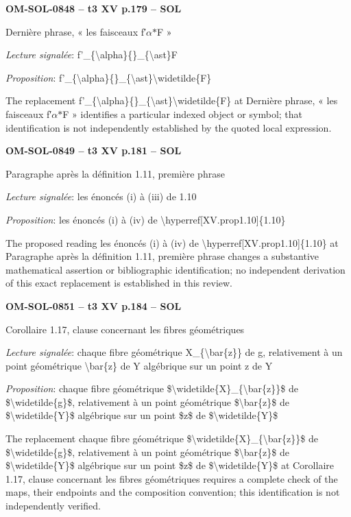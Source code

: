 \par\noindent\textbf{OM-SOL-0848 -- t3 XV p.179 -- SOL}\par
Dernière phrase, « les faisceaux f′\ensuremath{\alpha}\ensuremath{\ast}F »\par
\emph{Lecture signalée}: f'\_\{\textbackslash{}alpha\}\{\}\_\{\textbackslash{}ast\}F\par
\emph{Proposition}: f'\_\{\textbackslash{}alpha\}\{\}\_\{\textbackslash{}ast\}\textbackslash{}widetilde\{F\}\par
The replacement f'\_\{\textbackslash{}alpha\}\{\}\_\{\textbackslash{}ast\}\textbackslash{}widetilde\{F\} at Dernière phrase, « les faisceaux f′\ensuremath{\alpha}\ensuremath{\ast}F » identifies a particular indexed object or symbol; that identification is not independently established by the quoted local expression.\par
\par\noindent\textbf{OM-SOL-0849 -- t3 XV p.181 -- SOL}\par
Paragraphe après la définition 1.11, première phrase\par
\emph{Lecture signalée}: les énoncés (i) à (iii) de 1.10\par
\emph{Proposition}: les énoncés (i) à (iv) de \textbackslash{}hyperref[XV.prop1.10]\{1.10\}\par
The proposed reading les énoncés (i) à (iv) de \textbackslash{}hyperref[XV.prop1.10]\{1.10\} at Paragraphe après la définition 1.11, première phrase changes a substantive mathematical assertion or bibliographic identification; no independent derivation of this exact replacement is established in this review.\par
\par\noindent\textbf{OM-SOL-0851 -- t3 XV p.184 -- SOL}\par
Corollaire 1.17, clause concernant les fibres géométriques\par
\emph{Lecture signalée}: chaque fibre géométrique X\_\{\textbackslash{}bar\{z\}\} de g, relativement à un point géométrique \textbackslash{}bar\{z\} de Y algébrique sur un point z de Y\par
\emph{Proposition}: chaque fibre géométrique \$\textbackslash{}widetilde\{X\}\_\{\textbackslash{}bar\{z\}\}\$ de \$\textbackslash{}widetilde\{g\}\$, relativement à un point géométrique \$\textbackslash{}bar\{z\}\$ de \$\textbackslash{}widetilde\{Y\}\$ algébrique sur un point \$z\$ de \$\textbackslash{}widetilde\{Y\}\$\par
The replacement chaque fibre géométrique \$\textbackslash{}widetilde\{X\}\_\{\textbackslash{}bar\{z\}\}\$ de \$\textbackslash{}widetilde\{g\}\$, relativement à un point géométrique \$\textbackslash{}bar\{z\}\$ de \$\textbackslash{}widetilde\{Y\}\$ algébrique sur un point \$z\$ de \$\textbackslash{}widetilde\{Y\}\$ at Corollaire 1.17, clause concernant les fibres géométriques requires a complete check of the maps, their endpoints and the composition convention; this identification is not independently verified.\par
